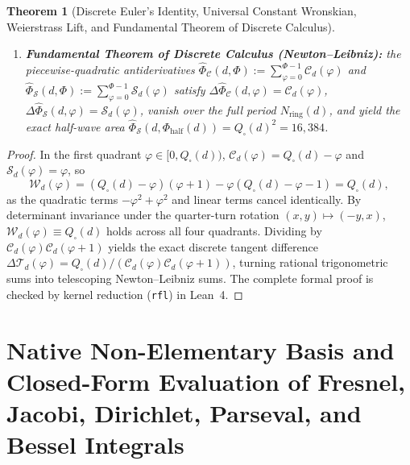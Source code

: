\documentclass[11pt,a4paper]{article}
\theoremstyle{plain}
\newtheorem{theorem}{Theorem}[section]
\theoremstyle{definition}
\begin{document}
\begin{theorem}[Discrete Euler's Identity, Universal Constant Wronskian, Weierstrass Lift, and Fundamental Theorem of Discrete Calculus]
\begin{enumerate}[label=\textbf{(\roman*)},leftmargin=*]
  at all $N_{\mathrm{ring}}(d)$ points, $X_d(\varphi)^2 + Y_d(\varphi)^2 = R_d(\varphi)^2$, and the one-step Euclidean cross and dot products are governed by $\mathcal{I}_d(\varphi) := \mathcal{C}_d(\varphi)\mathcal{C}_d(\varphi+1) + \mathcal{S}_d(\varphi)\mathcal{S}_d(\varphi+1)$:
  \begin{equation}
    \label{eq:brahmagupta-step}
    X_d(\varphi)Y_d(\varphi+1) - Y_d(\varphi)X_d(\varphi+1) \;=\; \|e\|_2^2\,Q_\square(d)\,\mathcal{I}_d(\varphi),\qquad
    X_d(\varphi)X_d(\varphi+1) + Y_d(\varphi)Y_d(\varphi+1) \;=\; \mathcal{I}_d(\varphi)^2 - Q_\square(d)^2.
  \end{equation}
\item \textbf{Fundamental Theorem of Discrete Calculus (Newton--Leibniz):}
  the piecewise-quadratic antiderivatives $\widehat{\Phi}_{\mathcal{C}}(d,\Phi) := \sum_{\varphi=0}^{\Phi-1}\mathcal{C}_d(\varphi)$ and $\widehat{\Phi}_{\mathcal{S}}(d,\Phi) := \sum_{\varphi=0}^{\Phi-1}\mathcal{S}_d(\varphi)$ satisfy $\Delta\widehat{\Phi}_{\mathcal{C}}(d,\varphi) = \mathcal{C}_d(\varphi)$, $\Delta\widehat{\Phi}_{\mathcal{S}}(d,\varphi) = \mathcal{S}_d(\varphi)$, vanish over the full period $N_{\mathrm{ring}}(d)$, and yield the exact half-wave area $\widehat{\Phi}_{\mathcal{S}}(d,\Phi_{\mathrm{half}}(d)) = Q_\square(d)^2 = 16,384$.
\end{enumerate}
\end{theorem}

\begin{proof}
In the first quadrant $\varphi\in[0,Q_\square(d))$, $\mathcal{C}_d(\varphi)=Q_\square(d)-\varphi$ and $\mathcal{S}_d(\varphi)=\varphi$, so
\[
  \mathcal{W}_d(\varphi) = (Q_\square(d)-\varphi)(\varphi+1) - \varphi(Q_\square(d)-\varphi-1) = Q_\square(d),
\]
as the quadratic terms $-\varphi^2+\varphi^2$ and linear terms cancel identically. By determinant invariance under the quarter-turn rotation $(x,y)\mapsto(-y,x)$, $\mathcal{W}_d(\varphi)\equiv Q_\square(d)$ holds across all four quadrants. Dividing by $\mathcal{C}_d(\varphi)\mathcal{C}_d(\varphi+1)$ yields the exact discrete tangent difference $\Delta\mathcal{T}_d(\varphi) = Q_\square(d)/(\mathcal{C}_d(\varphi)\mathcal{C}_d(\varphi+1))$, turning rational trigonometric sums into telescoping Newton--Leibniz sums. The complete formal proof is checked by kernel reduction (\texttt{rfl}) in Lean~4.
\end{proof}

\section{Native Non-Elementary Basis and Closed-Form Evaluation of Fresnel, Jacobi, Dirichlet, Parseval, and Bessel Integrals}
\label{sec:integrals}
\end{document}
